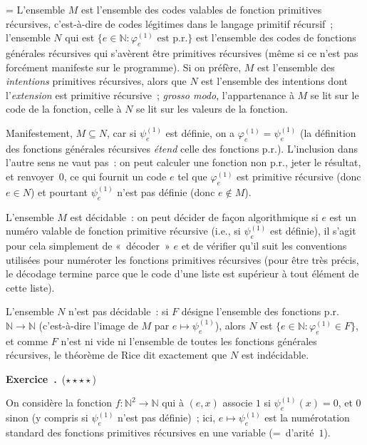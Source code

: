 \documentclass[12pt,a4paper]{article}
\theoremstyle{definition}
\newcommand\exercice{%
\refstepcounter{comcnt}\bigskip\noindent\textbf{Exercice~\thecomcnt.}}
\newif\ifcorrige
\newenvironment{corrige}%
{\ifcorrige\relax\else\setbox0=\vbox\bgroup\fi%
\smallbreak\footnotesize\noindent{\underbar{\textit{Corrigé.}}\quad}}
{{\hbox{}\nobreak\hfill\checkmark}%
\ifcorrige\relax\else\egroup\fi\par}
\begin{document}
\begin{corrige}
L'ensemble $M$ est l'ensemble des codes valables de fonction
primitives récursives, c'est-à-dire de codes légitimes dans le langage
primitif récursif ; l'ensemble $N$ qui est $\{e \in \mathbb{N} :
\varphi^{(1)}_e \text{~est~p.r.}\}$ est l'ensemble des codes de
fonctions générales récursives qui s'avèrent être primitives
récursives (même si ce n'est pas forcément manifeste sur le
programme).  Si on préfère, $M$ est l'ensemble des \emph{intentions}
primitives récursives, alors que $N$ est l'ensemble des intentions
dont l'\emph{extension} est primitive récursive ; \textit{grosso
  modo}, l'appartenance à $M$ se lit sur le code de la fonction, celle
à $N$ se lit sur les valeurs de la fonction.

Manifestement, $M \subseteq N$, car si $\psi^{(1)}_e$ est définie, on
a $\varphi^{(1)}_e = \psi^{(1)}_e$ (la définition des fonctions
générales récursives \emph{étend} celle des fonctions p.r.).
L'inclusion dans l'autre sens ne vaut pas : on peut calculer une
fonction non p.r., jeter le résultat, et renvoyer $0$, ce qui fournit
un code $e$ tel que $\varphi^{(1)}_e$ est primitive récursive (donc
$e\in N$) et pourtant $\psi^{(1)}_e$ n'est pas définie (donc $e\not\in
M$).

L'ensemble $M$ est décidable : on peut décider de façon algorithmique
si $e$ est un numéro valable de fonction primitive récursive (i.e., si
$\psi^{(1)}_e$ est définie), il s'agit pour cela simplement de
« décoder » $e$ et de vérifier qu'il suit les conventions utilisées
pour numéroter les fonctions primitives récursives (pour être très
précis, le décodage termine parce que le code d'une liste est
supérieur à tout élément de cette liste).

L'ensemble $N$ n'est pas décidable : si $F$ désigne l'ensemble des
fonctions p.r. $\mathbb{N} \to \mathbb{N}$ (c'est-à-dire l'image de
$M$ par $e \mapsto \psi^{(1)}_e$), alors $N$ est $\{e\in\mathbb{N} :
\varphi^{(1)}_e \in F\}$, et comme $F$ n'est ni vide ni l'ensemble de
toutes les fonctions générales récursives, le théorème de Rice dit
exactement que $N$ est indécidable.
\end{corrige}

%

\exercice\label{exercise-diagonalization-0-1-p-r-functions}\ (${\star}{\star}{\star}{\star}$)\par\nobreak

On considère la fonction $f\colon \mathbb{N}^2 \to \mathbb{N}$ qui à
$(e,x)$ associe $1$ si $\psi^{(1)}_e(x) = 0$, et $0$ sinon (y compris
si $\psi^{(1)}_e$ n'est pas définie) ; ici, $e \mapsto \psi^{(1)}_e$
est la numérotation standard des fonctions primitives récursives en
une variable (= d'arité $1$).
\end{document}
